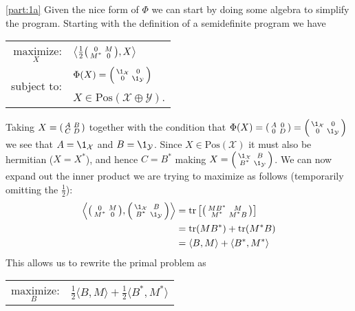 \documentclass[boxes,pages,color=SeaGreen]{homework}
\newcommand{\X}{\mathcal{X}}
\newcommand{\Y}{\mathcal{Y}}
\newcommand{\Pos}{\mathrm{Pos}}
\begin{document}
\begin{solution}
    \ref{part:1a}
    Given the nice form of $\Phi$ we can start by doing some algebra to simplify the program.
    Starting with the definition of a semidefinite program we have
    \begin{center}
        \begin{tabular}{rl}
            $\underset{X}{\text{maximize}}$: & $\left\langle \frac{1}{2}\spmqty{0 & M \\ M^* & 0}, X\right\rangle$ \\ \cmidrule(lr{1em}){2-2}
            \multirow{2}{*}{subject to:}     & $\Phi(X) = \spmqty{\1_\X           & 0 \\ 0 & \1_\Y}$                         \\
                                             & $X\in\Pos(\X\oplus\Y)$.
        \end{tabular}
    \end{center}
    Taking $X = \smqty(A & B \\ C & D)$ together with the condition that $\Phi(X) = \smqty(A & 0 \\ 0 & D) = \smqty(\1_\X & 0 \\ 0 & \1_\Y)$ we see that $A = \1_\X$ and $B = \1_\Y$.
    Since $X\in\Pos(\X)$ it must also be hermitian ($X = X^*$), and hence $C = B^*$ making $X = \smqty(\1_\X & B \\ B^* & \1_\Y)$.
    We can now expand out the inner product we are trying to maximize as follows (temporarily omitting the $\frac{1}{2}$):
    \begin{align*}
        \left\langle\spmqty{0 & M                                               \\ M^* & 0}, \spmqty{\1_\X & B \\ B^* & \1_\Y}\right\rangle & = \tr\qty[\spmqty{MB^* & M \\ M^* & M^*B}] \\
                              & = \tr(MB^*) + \tr(M^*B)                         \\
                              & = \langle B, M\rangle + \langle B^*, M^*\rangle
    \end{align*}
    This allows us to rewrite the primal problem as
    \begin{center}
        \begin{tabular}{rl}
            $\underset{B}{\text{maximize}}$: & $\frac{1}{2}\langle B, M\rangle + \frac{1}{2}\langle B^*, M^*\rangle$     \\ \cmidrule(lr{1em}){2-2}

\end{tabular}
\end{center}
\end{solution}
\end{document}
